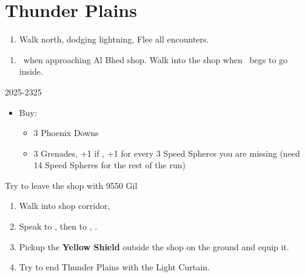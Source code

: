 \chapter{Thunder Plains}

\begin{enumerate}
    \item Walk north, dodging lightning, Flee all encounters.
\end{enumerate}
\begin{enumerate}[resume]
    \item \sd\ when approaching Al Bhed shop. Walk into the shop when \rikku\ begs to go inside.
\end{enumerate}
\begin{shop}{2025-2325}
    \begin{itemize}
        \item Buy:
        \begin{itemize}
            \item 3 Phoenix Downs
            \item 3 Grenades, +1 if \blitzloss, +1 for every 3 Speed Spheres you are missing (need 14 Speed Spheres for the rest of the run)
        \end{itemize}
    \end{itemize}
    Try to leave the shop with 9550 Gil
\end{shop}
\begin{enumerate}[resume]
    \item Walk into shop corridor, \cs[2:00]
    \item Speak to \auron, then to \rikku, \sd.
    \item Pickup the \textbf{Yellow Shield} outside the shop on the ground and equip it.
    \item Try to end Thunder Plains with the Light Curtain.
\end{enumerate}
